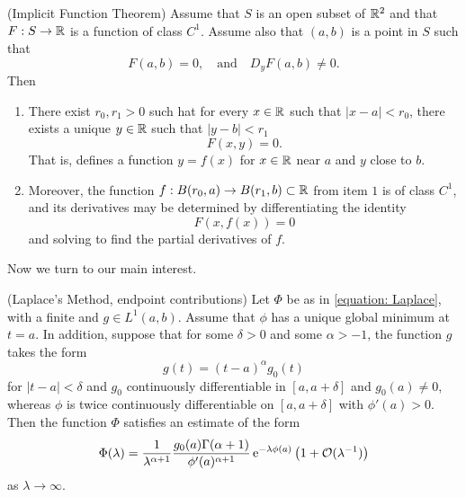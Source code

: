 \begin{teorema}	\label{Theorem: Implicit Function}
	(Implicit Function Theorem) Assume that $S$ is an open subset of $\mathbb{R}^{2}$ and that $F: S \rightarrow \mathbb{R}$ is a function of class $C^1$. Assume also that $(a, b)$ is a point in $S$ such that
	\begin{equation}
		F(a, b) = 0, \quad \text{and} \quad D_yF(a,b)\neq 0.
	\end{equation}
	Then
	\begin{enumerate}
		\item There exist $r_0, r_1 > 0$ such hat for every $x \in \mathbb{R}$ such that $|x-a| < r_0$, there exists a unique $y \in \mathbb{R}$ such that $|y - b| < r_1$
		\begin{equation}
			F(x,y) = 0.
		\end{equation}
		That is, defines a function $y = f(x)$ for $x \in \mathbb{R}$ near $a$ and $y$ close to $b$.
		\item Moreover, the function $f: B(r_0, a) \rightarrow B(r_1, b) \subset \mathbb{R}$ from item $1$ is of class $C^1$, and its derivatives may be determined by differentiating the identity 
		\begin{equation}
			F(x, f(x)) = 0
		\end{equation}
		and solving to find the partial derivatives of $f$.
	\end{enumerate}
\end{teorema}

Now we turn to our main interest.

\begin{teorema}
	(Laplace's Method, endpoint contributions) Let $\Phi$ be as in \eqref{equation: Laplace}, with a finite and $g \in L^1(a,b)$. Assume that $\phi$ has a unique global minimum at $t=a$. In addition, suppose that for some $\delta > 0$ and some $\alpha > -1$, the function $g$ takes the form
	\begin{equation}
		g(t) = (t-a)^{\alpha} g_0(t)
	\end{equation}
	for $|t-a| < \delta$ and $g_0$ continuously differentiable in $[a, a+\delta]$ and $g_0(a) \neq 0$, whereas $\phi$ is twice continuously differentiable on $[a, a+\delta]$ with $\phi'(a) > 0$. Then the function $\Phi$ satisfies an estimate of the form
	\begin{equation}
		\Phi(\lambda) = \frac{1}{\lambda^{\alpha + 1}} \frac{g_0(a) \Gamma(\alpha + 1)}{\phi'(a)^{\alpha + 1}} \operatorname{e}^{-\lambda \phi(a)} \left(1+\mathcal{O}(\lambda^{-1})\right)
	\end{equation}
	as $\lambda \rightarrow \infty$.
\end{teorema}

